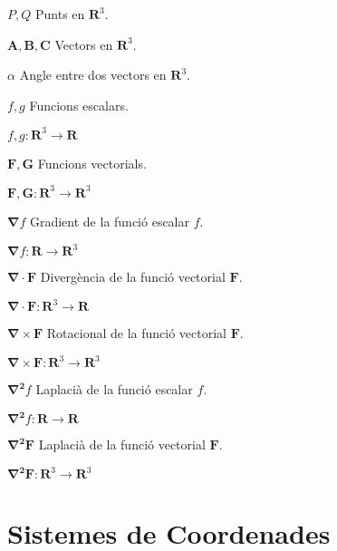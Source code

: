 \documentclass[catalan,a4paper,twoside,11pt]{article}
\begin{document}
\begin{list}{}
   \item[$P, Q$] Punts en $\boldsymbol{R}^3$.

   \item[$\boldsymbol{A,B,C}$] Vectors en $\boldsymbol{R}^3$.

   \item[$\alpha$] Angle entre dos vectors en $\boldsymbol{R}^3$.

   \item[$f,g$] Funcions escalars.

   $f,g \colon \boldsymbol{R}^3\rightarrow\boldsymbol{R}$

   \item[$\boldsymbol{F,G}$] Funcions vectorials.

   $\boldsymbol{F,G}\colon\boldsymbol{R}^3\rightarrow\boldsymbol{R}^3$

   \item[$\boldsymbol{\nabla}f$] Gradient de la funció escalar $f$.

   $\boldsymbol{\nabla}f\colon\boldsymbol{R}\rightarrow\boldsymbol{R}^3$

   \item[$\boldsymbol{\nabla\cdot F}$] Divergència de la funció vectorial $\boldsymbol{F}$.

   $\boldsymbol{\nabla\cdot F}\colon \boldsymbol{R}^3\rightarrow\boldsymbol{R}$

   \item[$\boldsymbol{\nabla\times F}$] Rotacional de la funció vectorial $\boldsymbol{F}$.

   $\boldsymbol{\nabla\times F}\colon   \boldsymbol{R}^3\rightarrow\boldsymbol{R}^3$

   \item[$\boldsymbol{\nabla^2}f$] Laplacià de la funció escalar $f$.

   $\boldsymbol{\nabla^2}f\colon \boldsymbol{R}\rightarrow\boldsymbol{R}$

   \item[$\boldsymbol{\nabla^2F}$] Laplacià de la funció vectorial $\boldsymbol{F}$.

    $\boldsymbol{\nabla^2F}\colon \boldsymbol{R}^3\rightarrow\boldsymbol{R}^3$
\end{list}

\newcommand{\va}{\ensuremath{\,\boldsymbol{e_x}}}
\newcommand{\vb}{\ensuremath{\,\boldsymbol{e_y}}}
\newcommand{\vc}{\ensuremath{\,\boldsymbol{e_z}}}
\section{Sistemes de Coordenades}
\end{document}
